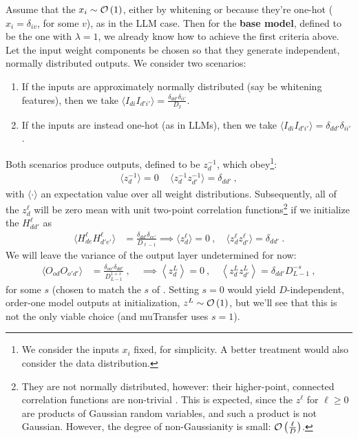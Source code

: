 \documentclass[11pt]{article}
\begin{document}
Assume that the $ x _{i  } \sim \mathcal{O} \left( 1 \right)  $, either by whitening or because they're
one-hot ($ x_{ i }=\delta_{ iv } $, for some $ v $), as in the LLM case. Then for the \textbf{base
model}, defined to be the one with $ \lambda =1 $, we already know how to achieve the first criteria
above. Let the input weight components be chosen so that they generate independent, normally
distributed outputs. We consider two scenarios:
\begin{enumerate}
    \item If the inputs are approximately normally distributed (say be whitening
        features), then we take $ \langle  I_{ d i }I_{ d'i' } \rangle  =  \frac{ \delta_{ dd'
        }\delta _{ ii' } }{ D_{ I } } $.
    \item If the inputs are instead one-hot (as in LLMs), then we take $ \langle  I_{ d i
        }I_{ d'i' } \rangle  =   \delta_{ dd' }\delta _{ ii' } $.
\end{enumerate}
Both scenarios produce outputs, defined to be $ z^{ -1 }_{ d } $, which obey\footnote{We consider
the inputs $ x_{ i } $ fixed, for simplicity. A better treatment would also consider the data
distribution.}:
\begin{align}
    \langle z^{  -1 }_{ d } \rangle=0 \, \quad  \langle z^{  -1 }_{ d }z^{ -1 }_{ d'} \rangle  = \delta_{ dd' }\ ,
\end{align}
with $ \langle \cdot  \rangle $ an expectation value over all weight distributions. Subsequently,
all of the $ z^{ \ell }_{ d } $ will be zero mean with unit two-point correlation
functions\footnote{They are not normally distributed, however: their higher-point, connected
    correlation functions are non-trivial \cite{physicalDL}. This is expected, since the $ z^{ \ell
    }  $ for $ \ell \ge 0 $ are products of Gaussian random variables, and such a product is not
Gaussian. However, the degree of non-Gaussianity is small: $ \mathcal{O} \left( \frac{ \ell }{ D } \right)
$.} if we initialize the $ H^{ \ell }_{ dd' } $ as
\begin{align}
    \langle H^{ \ell }_{ de }H^{ \ell }_{ d'e' } \rangle &=\frac{ \delta _{ dd' }\delta _{ ee' } }{
    D_{ \ell-1 } } \implies \langle z^{\ell}_{ d } \rangle =0 \ , \quad \langle z^{\ell}_{ d }z^{ \ell }_{ d'} \rangle  = \delta_{ dd' } \ .
\end{align}
We will leave the variance of the output layer undetermined for now:
\begin{align}
    \langle O _{ od }O_{ o'd' } \rangle &= \frac{ \delta _{ oo' }\delta _{ dd' } }{ D_{ L-1 }^{ 1+s } }
    \ , \quad \implies \left\langle z^{ L }_{ d } \right\rangle= 0 \ , \quad \left\langle z^{ L }_{ d }z^{ L }_{ d' } \right\rangle= \delta_{ dd' }D_{ L-1 }^{ -s } \ ,
\end{align}
for some $ s $ (chosen to match the $ s $ of
\cite{yaida2022metaprincipledfamilyhyperparameterscaling}. Setting $ s=0 $ would yield $ D
$-independent,  order-one model outputs at initialization, $ z^{ L }\sim \mathcal{O} \left( 1 \right)  $,
but we'll see that this is not the only viable choice (and muTransfer uses $ s=1 $).
\end{document}
